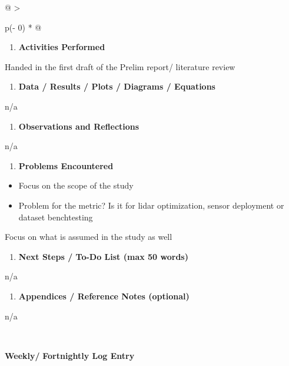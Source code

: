 \begin{longtable}[]{@{}
  >{\raggedright\arraybackslash}p{(\columnwidth - 0\tabcolsep) * }@{}}
\begin{minipage}[t]{\linewidth}
\begin{enumerate}
\def\labelenumi{\arabic{enumi}.}
\setcounter{enumi}{8}
\item
  \textbf{Activities Performed}
\end{enumerate}

Handed in the first draft of the Prelim report/ literature review

\begin{enumerate}
\def\labelenumi{\arabic{enumi}.}
\setcounter{enumi}{9}
\item
  \textbf{Data / Results / Plots / Diagrams / Equations}
\end{enumerate}

n/a

\begin{enumerate}
\def\labelenumi{\arabic{enumi}.}
\setcounter{enumi}{10}
\item
  \textbf{Observations and Reflections}
\end{enumerate}

n/a

\begin{enumerate}
\def\labelenumi{\arabic{enumi}.}
\setcounter{enumi}{11}
\item
  \textbf{Problems Encountered}
\end{enumerate}

\begin{itemize}
\item
  Focus on the scope of the study
\item
  Problem for the metric? Is it for lidar optimization, sensor
  deployment or dataset benchtesting
\end{itemize}

Focus on what is assumed in the study as well

\begin{enumerate}
\def\labelenumi{\arabic{enumi}.}
\setcounter{enumi}{12}
\item
  \textbf{Next Steps / To-Do List (max 50 words)}
\end{enumerate}

n/a

\begin{enumerate}
\def\labelenumi{\arabic{enumi}.}
\setcounter{enumi}{13}
\item
  \textbf{Appendices / Reference Notes (optional)}
\end{enumerate}

n/a
\end{minipage} \\
\begin{minipage}[t]{\linewidth}\raggedright
\textbf{Weekly/} \textbf{Fortnightly Log Entry}


\end{minipage}
\end{longtable}
